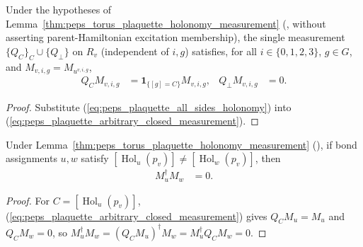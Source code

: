 \begin{lemma}%
    \label{thm:peps_torus_plaquette_all_sides_measurement}
    \leanok
    Under the hypotheses of Lemma~\ref{thm:peps_torus_plaquette_holonomy_measurement} (\cite[proof of Theorem~6.15]{Schuch2010PEPS}, without asserting parent-Hamiltonian excitation membership), the single measurement $\{Q_C\}_C\cup\{Q_\perp\}$ on $R_v$ (independent of $i,g$) satisfies, for all $i\in\{0,1,2,3\}$, $g\in G$, and $M_{v,i,g}=M_{u^{v,i,g}}$,
    \begin{align}
        Q_CM_{v,i,g}      & =\mathbf1_{\{[g]=C\}}M_{v,i,g}, &
        Q_\perp M_{v,i,g} & =0.
        \label{eq:peps_plaquette_all_sides_measurement}
    \end{align}
\end{lemma}
\begin{proof}\leanok
    Substitute (\ref{eq:peps_plaquette_all_sides_holonomy}) into (\ref{eq:peps_plaquette_arbitrary_closed_measurement}).
\end{proof}

\begin{corollary}%
    \label{cor:peps_torus_plaquette_class_orthogonality}
    \leanok
    Under Lemma~\ref{thm:peps_torus_plaquette_holonomy_measurement} (\cite[Theorem~6.15]{Schuch2010PEPS}), if bond assignments $u,w$ satisfy $[\operatorname{Hol}_u(p_v)]\neq[\operatorname{Hol}_w(p_v)]$, then
    \begin{align}
        M_u^\dagger M_w & =0.
        \label{eq:peps_plaquette_class_orthogonality}
    \end{align}
\end{corollary}
\begin{proof}\leanok
    For $C=[\operatorname{Hol}_u(p_v)]$, (\ref{eq:peps_plaquette_arbitrary_closed_measurement}) gives $Q_CM_u=M_u$ and $Q_CM_w=0$, so $M_u^\dagger M_w=(Q_CM_u)^\dagger M_w=M_u^\dagger Q_CM_w=0$.
\end{proof}

